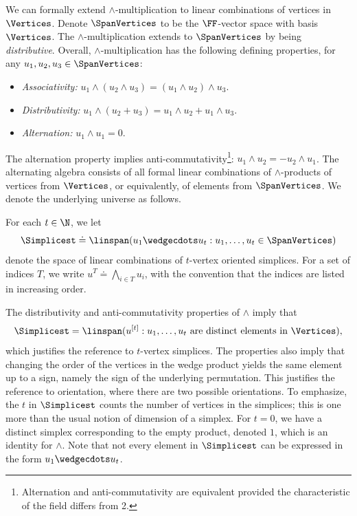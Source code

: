 \documentclass{toc}
\begin{document}
We can formally extend $\wedge$-multiplication to linear combinations of 
vertices in $\Vertices$. Denote $\SpanVertices$ to be the $\FF$-vector space
with basis $\Vertices$. The $\wedge$-multiplication extends to $\SpanVertices$ by
being \emph{distributive}. Overall, $\wedge$-multiplication 
has the following defining properties, for any $u_1,u_2,u_3\in \SpanVertices$:
\begin{itemize}
    \item \emph{Associativity:} $u_1\wedge (u_2\wedge u_3) = (u_1\wedge u_2)\wedge u_3$.
    \item \emph{Distributivity:} $u_1\wedge (u_2+u_3) = u_1\wedge u_2 + u_1\wedge u_3$.
    \item \emph{Alternation:} $u_1 \wedge u_1 = 0$.
\end{itemize}
The alternation property implies anti-commutativity\footnote{Alternation and anti-commutativity are equivalent provided the characteristic of the field differs from 2.}: $u_1\wedge u_2=-u_2\wedge u_1$.
The alternating algebra consists of all formal linear combinations of \(\wedge\)-products of vertices from $\Vertices$, or equivalently, of elements from $\SpanVertices$. 
We denote the underlying universe as follows.
\begin{definition}
  \label{def.simplex-space}
  For each \(t\in\N\),
  we let
   \[
    \Simplicest
    \doteq
    \linspan (u_1 \wedgecdots u_t : u_1,\ldots,u_t \in \SpanVertices)
  \]
  denote the space of linear combinations of \(t\)-vertex oriented simplices. For a set of indices $T$, we write $u^T \doteq \bigwedge_{i\in T} u_i$, with the convention that the indices are listed in increasing order. 
\end{definition}
The distributivity and anti-commutativity properties of $\wedge$ imply that 
\[\Simplicest = \linspan (u^{[t]} : u_1,\dots,u_t \text{ are distinct elements in } \Vertices),\] 
which justifies the reference to $t$-vertex simplices. The properties also imply that changing the order of the vertices in the wedge product yields the same element up to a sign, namely the sign of the underlying permutation. This justifies the reference to orientation, where there are two possible orientations. To emphasize, the \(t\) in \(\Simplicest\) counts the number of vertices in the simplices; this is one more than the usual notion of dimension of a simplex. For $t=0$, we have a distinct simplex corresponding to the empty product, denoted \(1\), which is an identity for \(\wedge\). Note that not every element in $\Simplicest$ can be expressed in the form $u_1\wedgecdots u_t$. 
\end{document}
